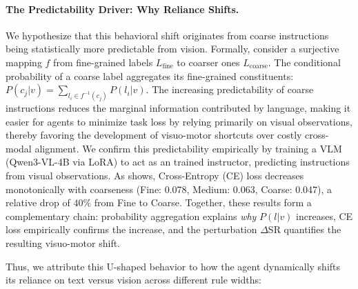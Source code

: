 \documentclass[11pt]{article}
\begin{document}
\paragraph{The Predictability Driver: Why Reliance Shifts.}
We hypothesize that this behavioral shift originates from coarse instructions being statistically more predictable from vision. Formally, consider a surjective mapping $f$ from fine-grained labels $L_{\text{fine}}$ to coarser ones $L_{\text{coarse}}$. The conditional probability of a coarse label aggregates its fine-grained constituents: $P(c_j | v) = \sum_{l_i \in f^{-1}(c_j)} P(l_i | v)$. The increasing predictability of coarse instructions reduces the marginal information contributed by language, making it easier for agents to minimize task loss by relying primarily on visual observations, thereby favoring the development of visuo-motor shortcuts over costly cross-modal alignment. We confirm this predictability empirically by training a VLM (Qwen3-VL-4B via LoRA) to act as an trained instructor, predicting instructions from visual observations. As  shows, Cross-Entropy (CE) loss decreases monotonically with coarseness (Fine: 0.078, Medium: 0.063, Coarse: 0.047), a relative drop of $40\%$ from Fine to Coarse. Together, these results form a complementary chain: probability aggregation explains \emph{why} $P(l|v)$ increases, CE loss empirically confirms the increase, and the perturbation $\Delta$SR quantifies the resulting visuo-motor shift.

Thus, we attribute this U-shaped behavior to how the agent dynamically shifts its reliance on text versus vision across different rule widths:
\end{document}
